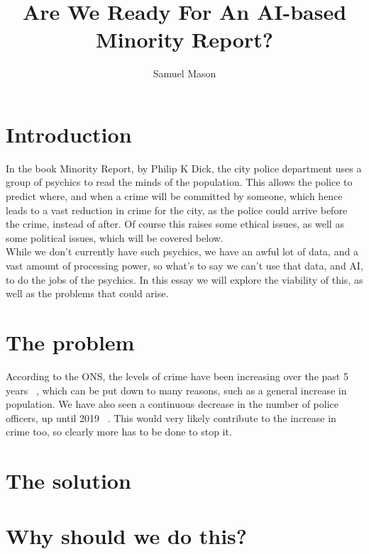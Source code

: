 \documentclass[12pt]{amsart}
\title{Are We Ready For An AI-based Minority Report?}
\author{Samuel Mason}
\begin{document}
    \maketitle
    \tableofcontents


    \section{Introduction}\label{sec:introduction}  %

    In the book Minority Report, by Philip K Dick, the city police department uses a group of psychics to read
    the minds of the population.
    This allows the police to predict where, and when a crime will be committed by someone, which hence leads to a vast
    reduction in crime for the city, as the police could arrive before the crime, instead of after.
    Of course this raises some ethical issues, as well as some political issues, which will be covered below.
    \\
    While we don't currently have such psychics, we have an awful lot of data, and a vast amount of processing power, so
    what's to say we can't use that data, and AI, to do the jobs of the psychics.
    In this essay we will explore the viability of this, as well as the problems that could arise.

    \section{The problem}\label{sec:the-problem}  %

    According to the ONS, the levels of crime have been increasing over the past 5 years ~\cite{ons-crime}, which can be
    put down to many reasons, such as a general increase in population.
    We have also seen a continuous decrease in the number of police officers, up until 2019 ~\cite{ho-pw}.
    This would very likely contribute to the increase in crime too, so clearly more has to be done to stop it.

    \section{The solution}\label{sec:the-solution}
    

    \section{Why should we do this?}\label{sec:why-should-we-do-this?}
    
\end{document}
